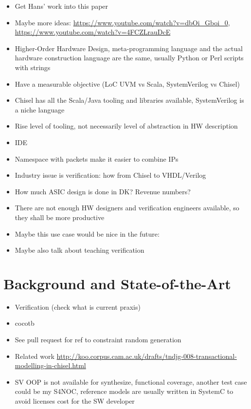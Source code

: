 \documentclass[conference]{IEEEtran}
\begin{document}
\begin{itemize}
\item Get Hans' work into this paper
\item Maybe more ideas: \url{https://www.youtube.com/watch?v=dbOi_Gboi_0}, \url{https://www.youtube.com/watch?v=4FCZLrauDcE}
\item Higher-Order Hardware Design, meta-programming language and the actual hardware construction language are the same, usually Python or Perl scripts with strings
\item Have a measurable objective (LoC UVM vs Scala, SystemVerilog vs Chisel)
\item Chisel has all the Scala/Java tooling and libraries available, SystemVerilog is a niche language
\item Rise level of tooling, not necessarily level of abstraction in HW description
\item IDE
\item Namespace with packets make it easier to combine IPs
\item Industry issue is verification: how from Chisel to VHDL/Verilog
\item How much ASIC design is done in DK? Revenue numbers?
\item There are not enough HW designers and verification engineers available, so they shall be more productive
\item Maybe this use case would be nice in the future:~\cite{s4noc:nocarc2019}
\item Maybe also talk about teaching verification
\end{itemize}

\section{Background and State-of-the-Art}
\label{sec:background}


\begin{itemize}
\item Verification (check what is current praxis)
\item cocotb
\item See pull request for ref to constraint random generation
\item Related work \url{http://koo.corpus.cam.ac.uk/drafts/tndjg-008-transactional-modelling-in-chisel.html}
\item SV OOP is not available for synthesize, functional coverage, another test case could be my S4NOC, reference models are usually written in SystemC to avoid licenses cost for the SW developer
\end{itemize}
\end{document}
